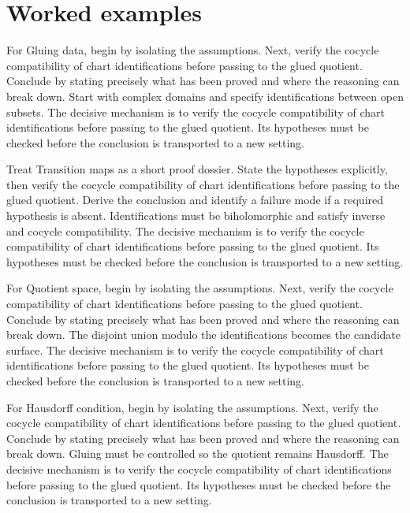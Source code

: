 \section{Worked examples}

\begin{example}\label{ex:iv25-worked-01}
For Gluing data, begin by isolating the assumptions. Next, verify the cocycle compatibility of chart identifications before passing to the glued quotient. Conclude by stating precisely what has been proved and where the reasoning can break down. Start with complex domains and specify identifications between open subsets. The decisive mechanism is to verify the cocycle compatibility of chart identifications before passing to the glued quotient. Its hypotheses must be checked before the conclusion is transported to a new setting.
\end{example}

\begin{example}\label{ex:iv25-worked-02}
Treat Transition maps as a short proof dossier. State the hypotheses explicitly, then verify the cocycle compatibility of chart identifications before passing to the glued quotient. Derive the conclusion and identify a failure mode if a required hypothesis is absent. Identifications must be biholomorphic and satisfy inverse and cocycle compatibility. The decisive mechanism is to verify the cocycle compatibility of chart identifications before passing to the glued quotient. Its hypotheses must be checked before the conclusion is transported to a new setting.
\end{example}

\begin{example}\label{ex:iv25-worked-03}
For Quotient space, begin by isolating the assumptions. Next, verify the cocycle compatibility of chart identifications before passing to the glued quotient. Conclude by stating precisely what has been proved and where the reasoning can break down. The disjoint union modulo the identifications becomes the candidate surface. The decisive mechanism is to verify the cocycle compatibility of chart identifications before passing to the glued quotient. Its hypotheses must be checked before the conclusion is transported to a new setting.
\end{example}

\begin{example}\label{ex:iv25-worked-04}
For Hausdorff condition, begin by isolating the assumptions. Next, verify the cocycle compatibility of chart identifications before passing to the glued quotient. Conclude by stating precisely what has been proved and where the reasoning can break down. Gluing must be controlled so the quotient remains Hausdorff. The decisive mechanism is to verify the cocycle compatibility of chart identifications before passing to the glued quotient. Its hypotheses must be checked before the conclusion is transported to a new setting.
\end{example}

